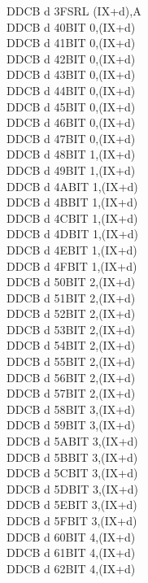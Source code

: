 \begin{multicols}{3}
{\begin{tabbing}
	DDCB d 3F\>SRL (IX+d),A\UNDOC\\
	DDCB d 40\>BIT 0,(IX+d)\UNDOC\\
	DDCB d 41\>BIT 0,(IX+d)\UNDOC\\
	DDCB d 42\>BIT 0,(IX+d)\UNDOC\\
	DDCB d 43\>BIT 0,(IX+d)\UNDOC\\
	DDCB d 44\>BIT 0,(IX+d)\UNDOC\\
	DDCB d 45\>BIT 0,(IX+d)\UNDOC\\
	DDCB d 46\>BIT 0,(IX+d)\\
	DDCB d 47\>BIT 0,(IX+d)\UNDOC\\
	DDCB d 48\>BIT 1,(IX+d)\UNDOC\\
	DDCB d 49\>BIT 1,(IX+d)\UNDOC\\
	DDCB d 4A\>BIT 1,(IX+d)\UNDOC\\
	DDCB d 4B\>BIT 1,(IX+d)\UNDOC\\
	DDCB d 4C\>BIT 1,(IX+d)\UNDOC\\
	DDCB d 4D\>BIT 1,(IX+d)\UNDOC\\
	DDCB d 4E\>BIT 1,(IX+d)\\
	DDCB d 4F\>BIT 1,(IX+d)\UNDOC\\
	DDCB d 50\>BIT 2,(IX+d)\UNDOC\\
	DDCB d 51\>BIT 2,(IX+d)\UNDOC\\
	DDCB d 52\>BIT 2,(IX+d)\UNDOC\\
	DDCB d 53\>BIT 2,(IX+d)\UNDOC\\
	DDCB d 54\>BIT 2,(IX+d)\UNDOC\\
	DDCB d 55\>BIT 2,(IX+d)\UNDOC\\
	DDCB d 56\>BIT 2,(IX+d)\\
	DDCB d 57\>BIT 2,(IX+d)\UNDOC\\
	DDCB d 58\>BIT 3,(IX+d)\UNDOC\\
	DDCB d 59\>BIT 3,(IX+d)\UNDOC\\
	DDCB d 5A\>BIT 3,(IX+d)\UNDOC\\
	DDCB d 5B\>BIT 3,(IX+d)\UNDOC\\
	DDCB d 5C\>BIT 3,(IX+d)\UNDOC\\
	DDCB d 5D\>BIT 3,(IX+d)\UNDOC\\
	DDCB d 5E\>BIT 3,(IX+d)\\
	DDCB d 5F\>BIT 3,(IX+d)\UNDOC\\
	DDCB d 60\>BIT 4,(IX+d)\UNDOC\\
	DDCB d 61\>BIT 4,(IX+d)\UNDOC\\
	DDCB d 62\>BIT 4,(IX+d)\UNDOC\\

\end{tabbing}}
\end{multicols}
